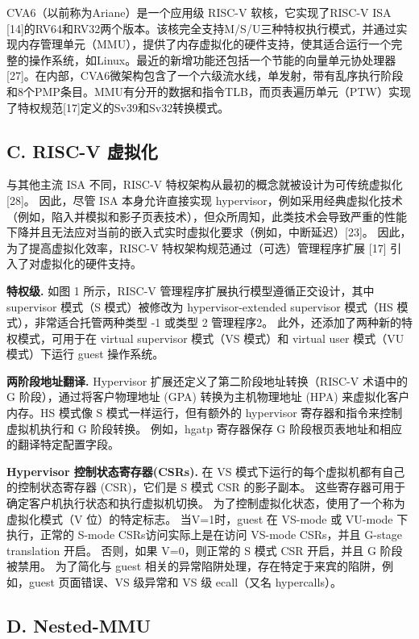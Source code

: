 CVA6（以前称为Ariane）是一个应用级 RISC-V 软核，它实现了RISC-V ISA [14]的RV64和RV32两个版本。该核完全支持M/S/U三种特权执行模式，并通过实现内存管理单元（MMU），提供了内存虚拟化的硬件支持，使其适合运行一个完整的操作系统，如Linux。最近的新增功能还包括一个节能的向量单元协处理器[27]。在内部，CVA6微架构包含了一个六级流水线，单发射，带有乱序执行阶段和8个PMP条目。MMU有分开的数据和指令TLB，而页表遍历单元（PTW）实现了特权规范[17]定义的Sv39和Sv32转换模式。

\subsection*{C. RISC-V 虚拟化}

与其他主流 ISA 不同，RISC-V 特权架构从最初的概念就被设计为可传统虚拟化 [28]。 因此，尽管 ISA 本身允许直接实现 hypervisor，例如采用经典虚拟化技术 （例如，陷入并模拟和影子页表技术），但众所周知，此类技术会导致严重的性能下降并且无法应对当前的嵌入式实时虚拟化要求（例如，中断延迟）[23]。 因此，为了提高虚拟化效率，RISC-V 特权架构规范通过（可选）管理程序扩展 [17] 引入了对虚拟化的硬件支持。

\textbf{特权级.} 如图 1 所示，RISC-V 管理程序扩展执行模型遵循正交设计，其中 supervisor 模式（S 模式）被修改为 hypervisor-extended supervisor 模式（HS 模式），非常适合托管两种类型 -1 或类型 2 管理程序2。 此外，还添加了两种新的特权模式，可用于在 virtual supervisor 模式（VS 模式）和 virtual user 模式（VU 模式）下运行 guest 操作系统。

\textbf{两阶段地址翻译.} Hypervisor 扩展还定义了第二阶段地址转换（RISC-V 术语中的 G 阶段），通过将客户物理地址 (GPA) 转换为主机物理地址 (HPA) 来虚拟化客户内存。HS 模式像 S 模式一样运行，但有额外的 hypervisor 寄存器和指令来控制虚拟机执行和 G 阶段转换。 例如，hgatp 寄存器保存 G 阶段根页表地址和相应的翻译特定配置字段。

\textbf{Hypervisor 控制状态寄存器(CSRs).} 在 VS 模式下运行的每个虚拟机都有自己的控制状态寄存器 (CSR)，它们是 S 模式 CSR 的影子副本。 这些寄存器可用于确定客户机执行状态和执行虚拟机切换。 为了控制虚拟化状态，使用了一个称为虚拟化模式（V 位）的特定标志。 当V=1时，guest 在 VS-mode 或 VU-mode 下执行，正常的 S-mode CSRs访问实际上是在访问 VS-mode CSRs，并且 G-stage translation 开启。 否则，如果 V=0，则正常的 S 模式 CSR 开启，并且 G 阶段被禁用。 为了简化与 guest 相关的异常陷阱处理，存在特定于来宾的陷阱，例如，guest 页面错误、VS 级异常和 VS 级 ecall（又名 hypercalls）。

\subsection*{D. Nested-MMU}

